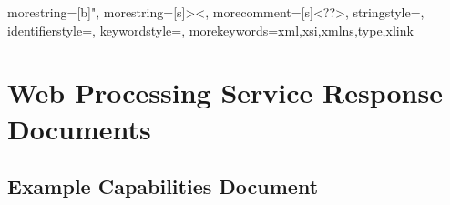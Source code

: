 
{
	morestring=[b]",
	morestring=[s]{>}{<},
	morecomment=[s]{<?}{?>},
	stringstyle=\color{black},
	identifierstyle=\color{darkblue},
	keywordstyle=\color{cyan},
	morekeywords={xml,xsi,xmlns,type,xlink}%
}


\chapter{Web Processing Service Response Documents}
\label{app:WPS}



\section{Example Capabilities Document}
\label{app:wpsCapabilities}
